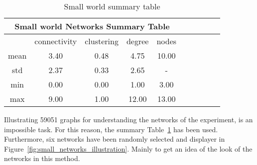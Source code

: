 \begin{table}[!hbtp]
	\centering
	\begin{adjustbox}{width=0.5\textwidth}
		\small
		\begin{tabular}{cccccccccc}
				\toprule
			\multicolumn{5}{|c|}{Small world Networks Summary Table}           \\ \hline
			     & connectivity & clustering & degree & nodes                  \\ \hline
			mean & 3.40         & 0.48       & 4.75   & 10.00                  \\ \hline
			std  & 2.37         & 0.33       & 2.65   & \multicolumn{1}{c}{-} \\ \hline
			min  & 0.00         & 0.00       & 1.00   & 3.00                   \\ \hline
			max  & 9.00         & 1.00       & 12.00  & 13.00                   \\ \bottomrule
		\end{tabular}
	\end{adjustbox}
	\caption{Small world summary table}
	\label{table:small-world-summary-table}
\end{table}

\newpage
Illustrating 59051 graphs for understanding the networks of the experiment, is
an impossible task. For this reason, the summary Table~\ref{table:small-world-summary-table}
has been used. Furthermore, six networks have been randomly selected and
displayer in Figure~\ref{fig:small_networks_illustration}. Mainly to get an idea
of the look of the networks in this method.

